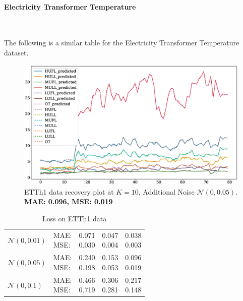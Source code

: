 \documentclass{article}
\begin{document}
{\paragraph{Electricity Transformer Temperature}\

The following is a similar table for the Electricity Transformer Temperature dataset.

\begin{figure}[H]
	\centering
	\includegraphics[width=\textwidth]{ETT_time_series_K10N005.eps}
	\caption{ETTh1 data recovery plot at $K=10$, Additional Noise $\mathcal{N}(0, 0.05)$. \textbf{MAE: 0.096, MSE: 0.019}}
	\label{fig:fig7}
\end{figure}

\begin{table}[!h]
\def\arraystretch{2.3}
\begin{center}
\caption{Loss on ETTh1 data}
\begin{tabular}{|l||l||*{3}{c|}}\hline
	\backslashbox{Noise}{Parameters}
	&\makebox[3em]{Metric}&\makebox[3em]{$K=2$}&\makebox[3em]{$K=4$}&\makebox[3em]{$K=10$}\\\hline
	$\mathcal{N}(0, 0.01)$&\makecell{ MAE: \\ MSE: } &\makecell{ 0.071 \\ 0.030 }&\makecell{ 0.047 \\ 0.004 }&\makecell{ 0.038 \\ 0.003 }\\\hline
	$\mathcal{N}(0, 0.05)$&\makecell{ MAE: \\ MSE: } &\makecell{ 0.240 \\ 0.198 }&\makecell{ 0.153 \\ 0.053 }&\makecell{ 0.096 \\ 0.019 }\\\hline
	$\mathcal{N}(0, 0.1)$& \makecell{ MAE: \\ MSE: } &\makecell{ 0.466 \\ 0.719 }&\makecell{ 0.306 \\ 0.281 }&\makecell{ 0.217 \\ 0.148 }\\\hline
\end{tabular}
\end{center}
\end{table}


}
\end{document}
